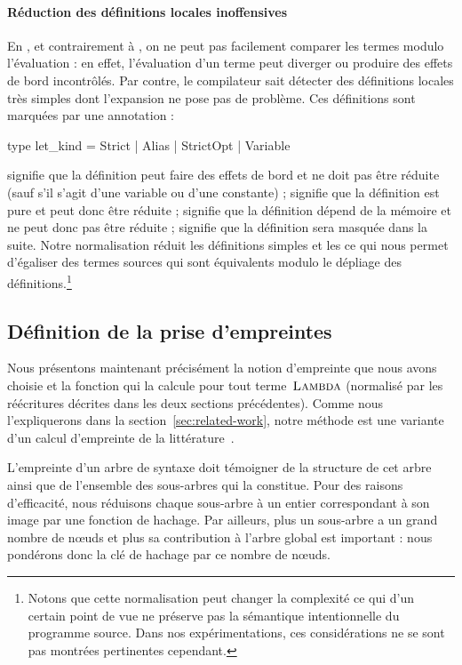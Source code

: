 \paragraph{Réduction des définitions locales inoffensives}

En {\OCaml}, et contrairement à {\Coq}, on ne peut pas facilement
comparer les termes modulo l'évaluation : en effet, l'évaluation d'un
terme peut diverger ou produire des effets de bord incontrôlés.
%
Par contre, le compilateur sait détecter des définitions locales
très simples dont l'expansion ne pose pas de problème. Ces définitions
sont marquées par une annotation :

\begin{ocaml}
type let_kind = Strict | Alias | StrictOpt | Variable
\end{ocaml}

\noindent {} signifie que la définition peut faire
des effets de bord et ne doit pas être réduite (sauf s'il s'agit d'une
variable ou d'une constante) ;  signifie que la
définition est pure et peut donc être réduite ; 
signifie que la définition dépend de la mémoire et ne peut donc pas
être réduite ;  signifie que la définition sera
masquée dans la suite. Notre normalisation réduit les
définitions  simples et les  ce qui
nous permet d'égaliser des termes sources qui sont équivalents modulo
le dépliage des définitions.\footnote{Notons que cette normalisation
peut changer la complexité ce qui d'un certain point de vue ne préserve
pas la sémantique intentionnelle du programme source. Dans nos
expérimentations, ces considérations ne se sont pas montrées pertinentes
cependant.}

\subsection{Définition de la prise d'empreintes}
\label{sec:fingerprint}

Nous présentons maintenant précisément la notion d'empreinte que nous
avons choisie et la fonction qui la calcule pour tout
terme~$\textsc{Lambda}$ (normalisé par les réécritures décrites dans les
deux sections précédentes). Comme nous l'expliquerons dans la
section~\ref{sec:related-work}, notre méthode est une variante d'un
calcul d'empreinte de la littérature~\cite{chilowicz:hal-00627811}.

L'empreinte d'un arbre de syntaxe doit témoigner de la structure de
cet arbre ainsi que de l'ensemble des sous-arbres qui la constitue. Pour
des raisons d'efficacité, nous réduisons chaque sous-arbre à un entier
correspondant à son image par une fonction de hachage. Par ailleurs,
plus un sous-arbre a un grand nombre de n{\oe}uds et plus sa
contribution à l'arbre global est important : nous pondérons donc
la clé de hachage par ce nombre de n{\oe}uds.

